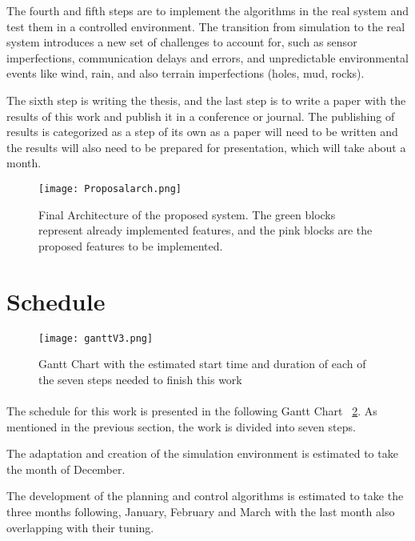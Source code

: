 The fourth and fifth steps are to implement the algorithms in the real system and test them in a controlled environment. The  
transition from simulation to the real system introduces a new set of challenges to account for, such as sensor imperfections, 
communication delays and errors, and unpredictable environmental events like wind, rain, and also terrain imperfections 
(holes, mud, rocks).

The sixth step is writing the thesis, and the last step is to write a paper with the results of this work and 
publish it in a conference or journal. The publishing of results is categorized as a step of its own as a paper 
will need to be written and the results will also need to be prepared for presentation, which will take about a month.
\clearpage

\begin{figure}[h]
    \centering
    \texttt{[image: Proposalarch.png]}
    \caption{Final Architecture of the proposed system. The green blocks represent already 
    implemented features, and the pink blocks are the proposed features to be implemented.}
    \label{fig:proposalarch}
\end{figure}


\section{Schedule}
\label{sec:schedule}
\begin{figure}[h]
    \centering
    \texttt{[image: ganttV3.png]}
    \caption{Gantt Chart with the estimated start time and duration of each of the seven steps needed to finish this work}
    \label{fig:schedule}
\end{figure}
\paragraph{}The schedule for this work is presented in the following Gantt Chart ~\ref{fig:schedule}. 
As mentioned in the previous section, the work is divided into seven steps. 

The adaptation and creation of the simulation environment is estimated to take the month of December. 

The development of the planning and control algorithms is estimated to take the 
three months following, January, February and March with the last month also overlapping with their tuning. 

